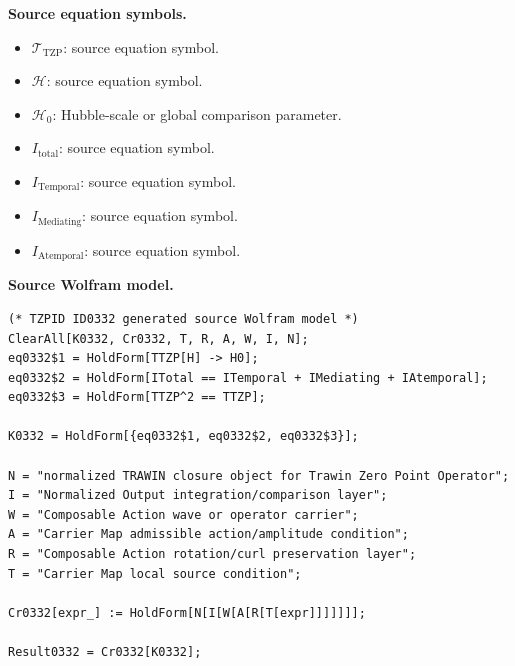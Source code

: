 \begin{minipage}[t]{0.49\linewidth}
\begingroup
\small
\raggedright
\textbf{Source equation symbols.}\par
\begin{itemize}[leftmargin=1.35em,itemsep=1pt,topsep=1pt,parsep=0pt]
    \item $\mathcal{T}_{\mathrm{TZP}}$: source equation symbol.
    \item $\mathcal{H}$: source equation symbol.
    \item $\mathcal{H}_{0}$: Hubble-scale or global comparison parameter.
    \item $I_{\mathrm{total}}$: source equation symbol.
    \item $I_{\mathrm{Temporal}}$: source equation symbol.
    \item $I_{\mathrm{Mediating}}$: source equation symbol.
    \item $I_{\mathrm{Atemporal}}$: source equation symbol.
\end{itemize}
\endgroup
\end{minipage}\hfill
\begin{minipage}[t]{0.47\linewidth}
\begingroup
\scriptsize
\raggedright
\textbf{Source Wolfram model.}\par
\begin{Verbatim}[fontsize=\tiny,breaklines=true,breakanywhere=true]
(* TZPID ID0332 generated source Wolfram model *)
ClearAll[K0332, Cr0332, T, R, A, W, I, N];
eq0332$1 = HoldForm[TTZP[H] -> H0];
eq0332$2 = HoldForm[ITotal == ITemporal + IMediating + IAtemporal];
eq0332$3 = HoldForm[TTZP^2 == TTZP];

K0332 = HoldForm[{eq0332$1, eq0332$2, eq0332$3}];

N = "normalized TRAWIN closure object for Trawin Zero Point Operator";
I = "Normalized Output integration/comparison layer";
W = "Composable Action wave or operator carrier";
A = "Carrier Map admissible action/amplitude condition";
R = "Composable Action rotation/curl preservation layer";
T = "Carrier Map local source condition";

Cr0332[expr_] := HoldForm[N[I[W[A[R[T[expr]]]]]]];

Result0332 = Cr0332[K0332];
\end{Verbatim}
\endgroup
\end{minipage}


